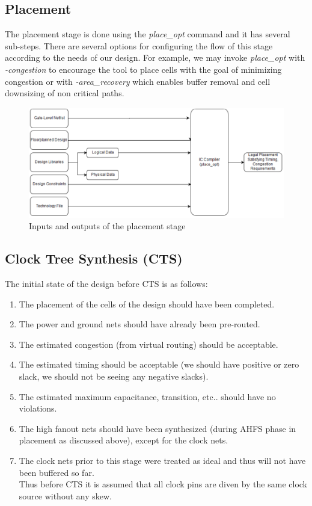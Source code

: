 \documentclass[../main.tex]{subfiles}
\begin{document}
\subsection{Placement}
The placement stage is done using the \textit{place\_opt} command and it has several sub-steps. There are several options for configuring the flow of this stage according to the needs of our design. For example, we may invoke \textit{place\_opt} with \textit{-congestion} to encourage the tool to place cells with the goal of minimizing congestion or with \textit{-area\_recovery} which enables buffer removal and cell downsizing of non critical paths.

\begin{figure}[h]
\centering
\includegraphics[width=15cm]{diagrams/IO_placment.PNG}
\caption{ Inputs and outputs of the placement stage}
\label{fig:IO_placment}
\end{figure}
\subsection{Clock Tree Synthesis (CTS)}
The initial state of the design before CTS is as follows:

\begin{enumerate}
\item The placement of the cells of the design should have been completed. 
\item The power and ground nets should have already been pre-routed. 
\item The estimated congestion (from virtual routing) should be acceptable. 
\item The estimated timing should be acceptable (we should have positive or zero slack, we should not be seeing any negative slacks). 
\item The estimated maximum capacitance, transition, etc.. should have no violations. 
\item The high fanout nets should have been synthesized (during AHFS phase in placement as 
discussed above), except for the clock nets. 
\item  The clock nets prior to this stage were treated as ideal and thus will not have been buffered 
so far.\\
Thus before CTS it is assumed that all clock pins are diven by the same clock source 
without any skew.
\end{enumerate}
\end{document}
